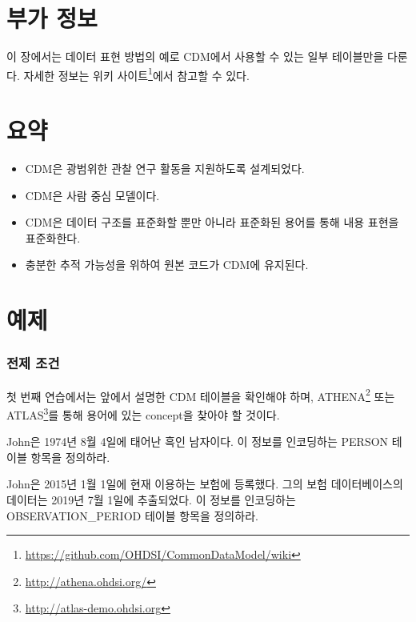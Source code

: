 \documentclass[10.5pt]{book}
\let\rmarkdownfootnote\footnote%
\def\footnote{\protect\rmarkdownfootnote}
\theoremstyle{definition}
\theoremstyle{definition}
\theoremstyle{definition}
\theoremstyle{remark}
\let\BeginKnitrBlock\begin \let\EndKnitrBlock\end
\begin{document}
\section{부가 정보}\label{-}

이 장에서는 데이터 표현 방법의 예로 CDM에서 사용할 수 있는 일부
테이블만을 다룬다. 자세한 정보는 위키 사이트\footnote{\url{https://github.com/OHDSI/CommonDataModel/wiki}}에서
참고할 수 있다.

\section{요약}\label{-2}

\BeginKnitrBlock{rmdsummary}
\begin{itemize}
\item
  CDM은 광범위한 관찰 연구 활동을 지원하도록 설계되었다.
\item
  CDM은 사람 중심 모델이다.
\item
  CDM은 데이터 구조를 표준화할 뿐만 아니라 표준화된 용어를 통해 내용
  표현을 표준화한다.
\item
  충분한 추적 가능성을 위하여 원본 코드가 CDM에 유지된다.
\end{itemize}
\EndKnitrBlock{rmdsummary}

\section{예제}

\subsubsection*{전제 조건}\label{-}

첫 번째 연습에서는 앞에서 설명한 CDM 테이블을 확인해야 하며,
ATHENA\footnote{\url{http://athena.ohdsi.org/}} 또는 ATLAS\footnote{\url{http://atlas-demo.ohdsi.org}}를
통해 용어에 있는 concept을 찾아야 할 것이다.

\BeginKnitrBlock{exercise}
\protect\hypertarget{exr:exerciseJohnPerson}{}{\label{exr:exerciseJohnPerson}
}John은 1974년 8월 4일에 태어난 흑인 남자이다. 이 정보를 인코딩하는
PERSON 테이블 항목을 정의하라.
\EndKnitrBlock{exercise}

\BeginKnitrBlock{exercise}
\protect\hypertarget{exr:exerciseJohnOp}{}{\label{exr:exerciseJohnOp}
}John은 2015년 1월 1일에 현재 이용하는 보험에 등록했다. 그의 보험
데이터베이스의 데이터는 2019년 7월 1일에 추출되었다. 이 정보를
인코딩하는 OBSERVATION\_PERIOD 테이블 항목을 정의하라.
\EndKnitrBlock{exercise}
\end{document}
